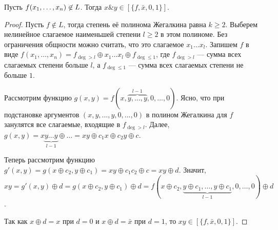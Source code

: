 \begin{lemma} Пусть $f(x_1, \ldots, x_n)\not\in L$. Тогда $x\& y \in [\{f, \bar{x}, 0, 1\}].$
\end{lemma}
\begin{proof} Пусть $f\not\in L$, тогда степень её полинома Жегалкина равна $k \geq 2$. Выберем нелинейное слагаемое наименьшей степени $l\geq 2$ в этом полиноме. Без ограничения общности можно считать, что это слагаемое $x_1...x_l$. Запишем $f$ в виде $f(x_1,\ldots,x_n) = f_{\deg > l} \oplus x_1...x_l \oplus f_{\deg \leq 1}$, где $f_{\deg > l}$ --- сумма всех слагаемых степени больше $l$, а $f_{\deg \leq 1}$ --- сумма всех слагаемых степени не больше $1$.

Рассмотрим функцию $g(x,y) = f(x, \overbrace{y,...,y}^{l-1}, 0,...,0)$. Ясно, что при подстановке аргументов $(x, y,...,y, 0,...,0)$ в полином Жегалкина для $f$ занулятся все слагаемые, входящие в $f_{\deg > l}$. 
Далее, $g(x,y) = x\underbrace{y...y}_{l-1} \oplus \ldots = xy \oplus c_1x \oplus c_2y \oplus c$. 

Теперь рассмотрим функцию $g'(x,y) = g(x\oplus c_2, y\oplus c_1) = xy \oplus c_1c_2 \oplus c = xy \oplus d$. Значит, $xy = g'(x,y) \oplus d = g(x\oplus c_2, y\oplus c_1) \oplus d = f(x \oplus c_2, \underbrace{y\oplus c_1,\ldots,y\oplus c_1}_{l-1},0,\ldots,0)\oplus d$. 

Так как %
$x\oplus d = x$ при $d=0$ и $x\oplus d = \bar{x}$ при $d=1$, то $xy \in [\{f, \bar{x}, 0, 1\}].$
\end{proof}


